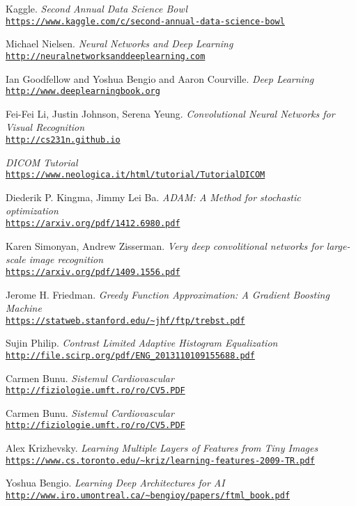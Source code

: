 \begin{thebibliography}{9} 

Kaggle. \textit{Second Annual Data Science Bowl}
\\\texttt{\url{https://www.kaggle.com/c/second-annual-data-science-bowl}}

Michael Nielsen. \textit{Neural Networks and Deep Learning}
\\\texttt{\url{http://neuralnetworksanddeeplearning.com}}

Ian Goodfellow and Yoshua Bengio and Aaron Courville. \textit{Deep Learning}
\\\texttt{\url{http://www.deeplearningbook.org}}

Fei-Fei Li, Justin Johnson, Serena Yeung. \textit{Convolutional Neural Networks for Visual Recognition}
\\\texttt{\url{http://cs231n.github.io}}

\textit{DICOM Tutorial}
\\\texttt{\url{https://www.neologica.it/html/tutorial/TutorialDICOM}}

Diederik P. Kingma, Jimmy Lei Ba. \textit{ADAM: A Method for stochastic optimization}
\\\texttt{\url{https://arxiv.org/pdf/1412.6980.pdf}}

Karen Simonyan, Andrew Zisserman. \textit{Very deep convolitional networks for large-scale image recognition}
\\\texttt{\url{https://arxiv.org/pdf/1409.1556.pdf}}

Jerome H. Friedman. \textit{Greedy Function Approximation: A Gradient Boosting Machine}
\\\texttt{\url{https://statweb.stanford.edu/~jhf/ftp/trebst.pdf}}

Sujin Philip. \textit{Contrast Limited Adaptive Histogram Equalization}
\\\texttt{\url{http://file.scirp.org/pdf/ENG_2013110109155688.pdf}}

Carmen Bunu. \textit{Sistemul Cardiovascular}
\\\texttt{\url{http://fiziologie.umft.ro/ro/CV5.PDF}}

Carmen Bunu. \textit{Sistemul Cardiovascular}
\\\texttt{\url{http://fiziologie.umft.ro/ro/CV5.PDF}}

Alex Krizhevsky. \textit{Learning Multiple Layers of Features from Tiny Images}
\\\texttt{\url{https://www.cs.toronto.edu/~kriz/learning-features-2009-TR.pdf}}

Yoshua Bengio. \textit{Learning Deep Architectures for AI}
\\\texttt{\url{http://www.iro.umontreal.ca/~bengioy/papers/ftml_book.pdf}}

\end{thebibliography}